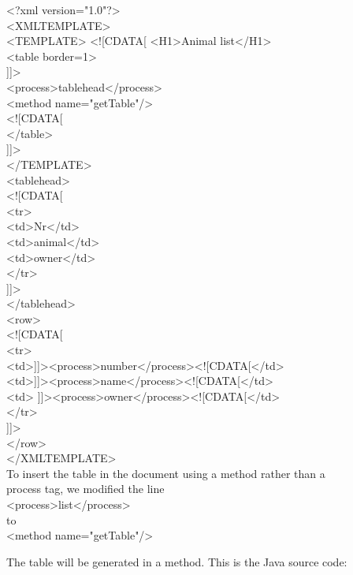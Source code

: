 \begin{xml}
<?xml version="1.0"?>\\
<XMLTEMPLATE>\\

<TEMPLATE>
<![CDATA[ <H1>Animal list</H1>\\
<table border=1>\\
]]>\\
<process>tablehead</process>\\
<method name="getTable"/>\\
<![CDATA[\\
</table>\\
]]>\\
</TEMPLATE>\\
<tablehead>\\
<![CDATA[\\
<tr>\\
<td>Nr</td>\\
<td>animal</td>\\
<td>owner</td>\\
</tr>\\
]]>\\
</tablehead>\\
<row>\\
<![CDATA[\\
<tr>\\
<td>]]><process>number</process><![CDATA[</td>\\
<td>]]><process>name</process><![CDATA[</td>\\
<td> ]]><process>owner</process><![CDATA[</td>\\
</tr>\\
]]>\\
</row>\\
</XMLTEMPLATE>\\

To insert the table in the document using a method rather than a\\
process tag, we modified the line\\

<process>list</process>\\

to\\

<method name="getTable"/>\\
\end{xml}

The table will be generated in a method. This is the Java source code:

